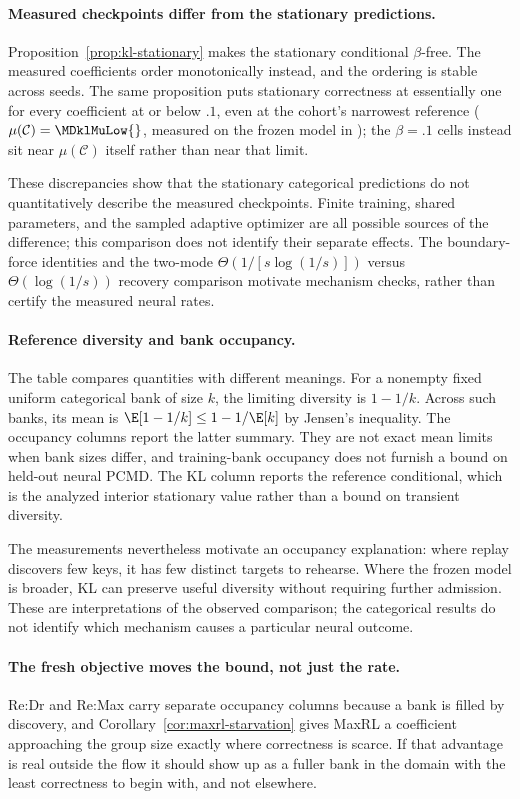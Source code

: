 \paragraph{Measured checkpoints differ from the stationary predictions.}
Proposition~\ref{prop:kl-stationary} makes the stationary conditional
$\beta$-free. The measured coefficients order \pmd{} monotonically instead, and
the ordering is stable across seeds. The same proposition puts stationary
correctness at essentially one for every coefficient at or below $.1$, even at
the cohort's narrowest reference ($\mu(\mathcal C)=\MDklMuLow{}$, measured on
the frozen model in \MDklMuLowDomain{}); the $\beta=.1$ cells instead sit near
$\mu(\mathcal C)$ itself rather than near that limit.

These discrepancies show that the stationary categorical predictions do
not quantitatively describe the measured checkpoints. Finite training,
shared parameters, and the sampled adaptive optimizer are all possible
sources of the difference; this comparison does not identify their separate
effects. The boundary-force identities and the two-mode
$\Theta(1/[s\log(1/s)])$ versus $\Theta(\log(1/s))$ recovery comparison
motivate mechanism checks, rather than certify the measured neural rates.

\paragraph{Reference diversity and bank occupancy.}
The table compares quantities with different meanings. For a nonempty fixed
uniform categorical bank of size $k$, the limiting diversity is $1-1/k$.
Across such banks, its mean is $\E[1-1/k]\le1-1/\E[k]$ by Jensen's
inequality. The occupancy columns report the latter summary. They are not
exact mean limits when bank sizes differ, and training-bank occupancy does
not furnish a bound on held-out neural PCMD.
The KL column reports the reference conditional, which is the analyzed
interior stationary value rather than a bound on transient diversity.

The measurements nevertheless motivate an occupancy explanation: where
replay discovers few keys, it has few distinct targets to rehearse.
Where the frozen model is broader, KL can preserve useful diversity without
requiring further admission. These are interpretations of the observed
comparison; the categorical results do not identify which mechanism
causes a particular neural outcome.

\paragraph{The fresh objective moves the bound, not just the rate.}
Re:Dr and Re:Max carry separate occupancy columns because a bank is filled by
discovery, and Corollary~\ref{cor:maxrl-starvation} gives MaxRL a coefficient
approaching the group size exactly where correctness is scarce. If that
advantage is real outside the flow it should show up as a fuller bank in the
domain with the least correctness to begin with, and not elsewhere.

